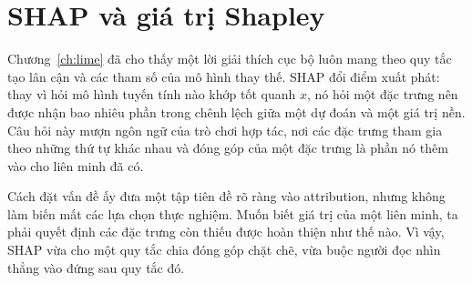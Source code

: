 \chapter{SHAP và giá trị Shapley}
\label{ch:shap}

Chương~\ref{ch:lime} đã cho thấy một lời giải thích cục bộ luôn mang theo
quy tắc tạo lân cận và các tham số của mô hình thay thế. SHAP đổi điểm xuất
phát: thay vì hỏi mô hình tuyến tính nào khớp tốt quanh $x$, nó hỏi một đặc
trưng nên được nhận bao nhiêu phần trong chênh lệch giữa một dự đoán và một
giá trị nền. Câu hỏi này mượn ngôn ngữ của trò chơi hợp tác, nơi các đặc trưng
tham gia theo những thứ tự khác nhau và đóng góp của một đặc trưng là phần nó
thêm vào cho liên minh đã có.

Cách đặt vấn đề ấy đưa một tập tiên đề rõ ràng vào attribution, nhưng không
làm biến mất các lựa chọn thực nghiệm. Muốn biết giá trị của một liên minh,
ta phải quyết định các đặc trưng còn thiếu được hoàn thiện như thế nào. Vì
vậy, SHAP vừa cho một quy tắc chia đóng góp chặt chẽ, vừa buộc người đọc nhìn
thẳng vào  đứng sau quy tắc đó.









